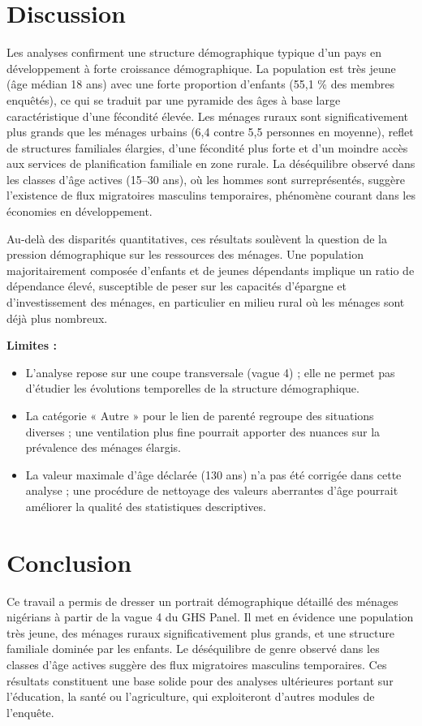 \documentclass[
  11pt,
]{article}
\begin{document}
\section{Discussion}\label{discussion}

Les analyses confirment une structure démographique typique d'un pays en
développement à forte croissance démographique. La population est très
jeune (âge médian 18 ans) avec une forte proportion d'enfants (55,1 \%
des membres enquêtés), ce qui se traduit par une pyramide des âges à
base large caractéristique d'une fécondité élevée. Les ménages ruraux
sont significativement plus grands que les ménages urbains (6,4 contre
5,5 personnes en moyenne), reflet de structures familiales élargies,
d'une fécondité plus forte et d'un moindre accès aux services de
planification familiale en zone rurale. La déséquilibre observé dans les
classes d'âge actives (15--30 ans), où les hommes sont surreprésentés,
suggère l'existence de flux migratoires masculins temporaires, phénomène
courant dans les économies en développement.

Au-delà des disparités quantitatives, ces résultats soulèvent la
question de la pression démographique sur les ressources des ménages.
Une population majoritairement composée d'enfants et de jeunes
dépendants implique un ratio de dépendance élevé, susceptible de peser
sur les capacités d'épargne et d'investissement des ménages, en
particulier en milieu rural où les ménages sont déjà plus nombreux.

\textbf{Limites :}

\begin{itemize}
\item
  L'analyse repose sur une coupe transversale (vague 4) ; elle ne permet
  pas d'étudier les évolutions temporelles de la structure
  démographique.
\item
  La catégorie « Autre » pour le lien de parenté regroupe des situations
  diverses ; une ventilation plus fine pourrait apporter des nuances sur
  la prévalence des ménages élargis.
\item
  La valeur maximale d'âge déclarée (130 ans) n'a pas été corrigée dans
  cette analyse ; une procédure de nettoyage des valeurs aberrantes
  d'âge pourrait améliorer la qualité des statistiques descriptives.
\end{itemize}

\section{Conclusion}\label{conclusion}

Ce travail a permis de dresser un portrait démographique détaillé des
ménages nigérians à partir de la vague 4 du GHS Panel. Il met en
évidence une population très jeune, des ménages ruraux significativement
plus grands, et une structure familiale dominée par les enfants. Le
déséquilibre de genre observé dans les classes d'âge actives suggère des
flux migratoires masculins temporaires. Ces résultats constituent une
base solide pour des analyses ultérieures portant sur l'éducation, la
santé ou l'agriculture, qui exploiteront d'autres modules de l'enquête.
\end{document}
